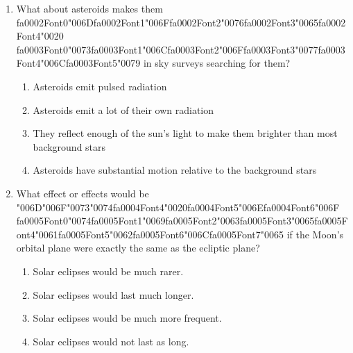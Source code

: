 \documentclass[12pt]{article}
\begin{document}
\begin{enumerate}[label=\arabic*.]
\begin{enumerate}[label=(\alph*)]
    \item Amino acids with a preferred orientation or "chirality"
\end{enumerate}
\item What about asteroids makes them {\csname fa0002Font0\endcsname\char"006D}{\csname fa0002Font1\endcsname\char"006F}{\csname fa0002Font2\endcsname\char"0076}{\csname fa0002Font3\endcsname\char"0065}{\csname fa0002Font4\endcsname\char"0020} {\csname fa0003Font0\endcsname\char"0073}{\csname fa0003Font1\endcsname\char"006C}{\csname fa0003Font2\endcsname\char"006F}{\csname fa0003Font3\endcsname\char"0077}{\csname fa0003Font4\endcsname\char"006C}{\csname fa0003Font5\endcsname\char"0079} in sky surveys searching for them?
\begin{enumerate}[label=(\alph*)]
    \item Asteroids emit pulsed radiation
    \item Asteroids emit a lot of their own radiation
    \item They reflect enough of the sun's light to make them brighter than most background stars
    \item Asteroids have substantial motion relative to the background stars
\end{enumerate}
\item What effect or effects would be {\char"006D}{\char"006F}{\char"0073}{\char"0074}{\csname fa0004Font4\endcsname\char"0020}{\csname fa0004Font5\endcsname\char"006E}{\csname fa0004Font6\endcsname\char"006F} {\csname fa0005Font0\endcsname\char"0074}{\csname fa0005Font1\endcsname\char"0069}{\csname fa0005Font2\endcsname\char"0063}{\csname fa0005Font3\endcsname\char"0065}{\csname fa0005Font4\endcsname\char"0061}{\csname fa0005Font5\endcsname\char"0062}{\csname fa0005Font6\endcsname\char"006C}{\csname fa0005Font7\endcsname\char"0065} if the Moon's orbital plane were exactly
the same as the ecliptic plane?
\begin{enumerate}[label=(\alph*)]
    \item Solar eclipses would be much rarer.
    \item Solar eclipses would last much longer.
    \item Solar eclipses would be much more frequent.
    \item Solar eclipses would not last as long.
\end{enumerate}
\end{enumerate}
\end{document}
